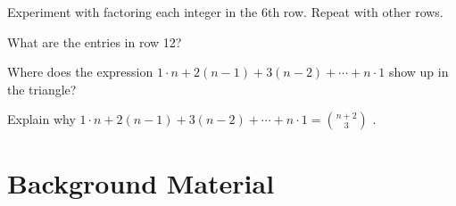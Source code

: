 \documentclass[10pt,]{book}
\theoremstyle{plain}
\theoremstyle{definition}
\theoremstyle{definition}
\theoremstyle{definition}
\theoremstyle{definition}
\numberwithin{equation}{chapter}
\begin{document}
\begin{divisionexercise}{3}\hypertarget{exercise-173}{}
\hypertarget{p-1344}{}%
Experiment with factoring each integer in the 6th row. Repeat with other rows.%
\end{divisionexercise}%
\begin{divisionexercise}{4}\hypertarget{exercise-174}{}
\hypertarget{p-1345}{}%
What are the entries in row 12?%
\end{divisionexercise}%
\begin{divisionexercise}{5}\hypertarget{exercise-175}{}
\hypertarget{p-1346}{}%
Where does the expression \(1 \cdot n + 2\left( n - 1 \right) + 3\left( n - 2 \right) + \cdots + n \cdot 1\) show up in the triangle?%
\end{divisionexercise}%
\begin{divisionexercise}{6}\hypertarget{exercise-176}{}
\hypertarget{p-1347}{}%
Explain why \(1 \cdot n + 2\left( n - 1 \right) + 3\left( n - 2 \right) + \cdots + n \cdot 1 =
\binom{n + 2}{3}\) .%
\end{divisionexercise}%
\typeout{************************************************}
\typeout{************************************************}
\chapter[{Background Material}]{Background Material}\label{ch_additionalTopics}
\typeout{************************************************}
\typeout{************************************************}
\end{document}
